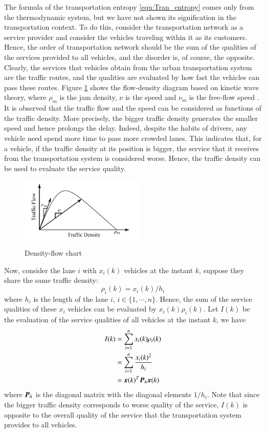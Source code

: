 \documentclass[preprint,authoryear,12pt]{elsarticle}
\renewcommand{\vec}[1]{\mbox{\boldmath$#1$}}
\newcommand{\mat}[1]{\mbox{\boldmath$#1$}}
\begin{document}
The formula of the transportation entropy \eqref{equ:Tran_entropy}
comes only from the thermodynamic system, but we have not shown its
signification in the transportation context. To do this, consider the
transportation network as a service provider and consider the
vehicles traveling within it as its customers. Hence, the order of
transportation network should be the sum of the qualities of the
services provided to all vehicles, and the disorder is, of course,
the opposite. Clearly, the services that vehicles obtain from the
urban transportation system are the traffic routes, and the qualities
are evaluated by how fast the vehicles can pass these routes. Figure
\ref{fig:d_q} shows the flow-density diagram based on kinetic wave
theory, where $\rho_m$ is the jam density, $\nu$ is the speed and
$\nu_m$ is the free-flow speed \citep{ukkusuri_robust_2010}. It is
observed that the traffic flow and the speed can be considered as
functions of the traffic density. More precisely, the bigger traffic
density generates the smaller speed and hence prolongs the delay.
Indeed, despite the habits of drivers, any vehicle need spend more
time to pass more crowded lanes. This indicates that, for a vehicle,
if the traffic density at its position is bigger, the service that it
receives from the transportation system is considered worse. Hence,
the traffic density can be used to evaluate the service quality.

\begin{figure}[ht]
  \centering
  \includegraphics[height=3cm]{pics/d-q}\\
  \caption{Density-flow chart}
  \label{fig:d_q}
\end{figure}

Now, consider the lane $i$ with $x_i(k)$ vehicles at the instant $k$,
suppose they share the same traffic density:
$$\rho_i(k)=x_i(k)/h_i$$
where $h_i$ is the length of the lane $i$, $i\in \{1,\cdots,n\}$.
Hence, the sum of the service qualities of these $x_i$ vehicles can
be evaluated by $x_i(k)\rho_i(k)$. Let $I(k)$ be the evaluation of
the service qualities of all vehicles at the instant $k$, we have
\begin{equation}
\label{equ:quality_service}
\begin{split}
I(k)&=\sum_{i=1}^{n} x_i(k)\rho_i(k)\\
&=\sum_{i=1}^{n}\frac{x_i(k)^2}{h_i}\\
&=\vec{x}(k)^T\mat{P}_h\vec{x}(k)
\end{split}
\end{equation}
where $\mat{P}_h$ is the diagonal matrix with the diagonal elements
$1/h_i$. Note that since the bigger traffic density corresponds to
worse quality of the service, $I(k)$ is opposite to the overall
quality of the service that the transportation system provides to all
vehicles.
\end{document}
